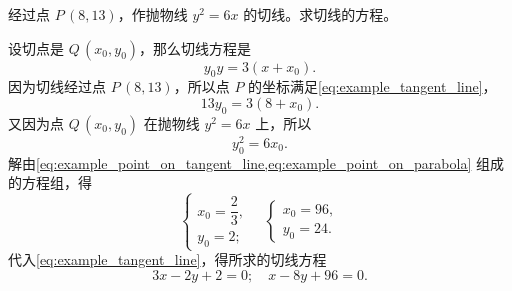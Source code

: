 \begin{example}
  经过点 $P\,(8,13)$，作抛物线 $y^2=6x$ 的切线。求切线的方程。
\end{example}
\begin{solution}
  设切点是 $Q\,(x_0,y_0)$，那么切线方程是
  \begin{equation}
    \label{eq:example_tangent_line}
    y_0y=3(x+x_0).
  \end{equation}
  因为切线经过点 $P\,(8,13)$，所以点 $P$ 的坐标满足\cref{eq:example_tangent_line}，
  \begin{equation}
    \label{eq:example_point_on_tangent_line}
    13y_0=3(8+x_0).
  \end{equation}
  又因为点 $Q\,(x_0,y_0)$ 在抛物线 $y^2=6x$ 上，所以
  \begin{equation}
    \label{eq:example_point_on_parabola}
    y_0^2=6x_0.
  \end{equation}
  解由\cref{eq:example_point_on_tangent_line,eq:example_point_on_parabola} 组成的方程组，得
  \[ \begin{cases}x_0=\dfrac{2}{3},\\y_0=2;\end{cases} \quad \begin{cases}x_0=96,\\y_0=24.\end{cases}\]
  代入\cref{eq:example_tangent_line}，得所求的切线方程
  \[ 3x-2y+2=0;\quad x-8y+96=0.\]
\end{solution}

